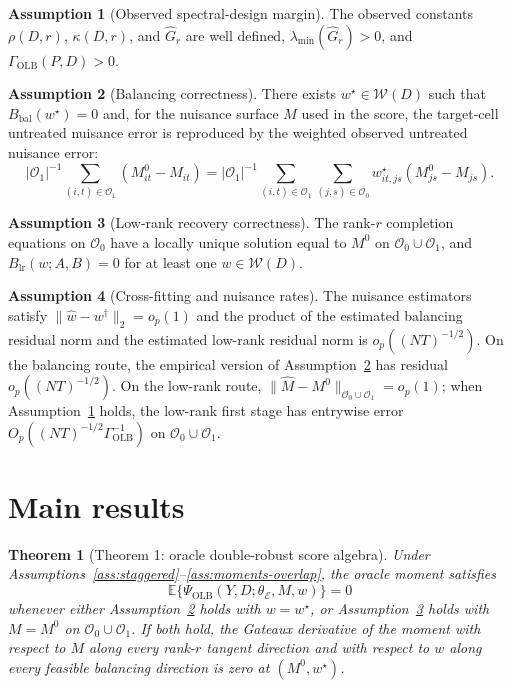 \documentclass[11pt]{article}
\newcommand{\E}{\mathbb{E}}
\theoremstyle{definition}
\newtheorem{assumption}{Assumption}
\theoremstyle{plain}
\newtheorem{theorem}{Theorem}
\theoremstyle{remark}
\begin{document}
\begin{assumption}[Observed spectral-design margin]\label{ass:spectral-margin}
The observed constants \(\rho(D,r)\), \(\kappa(D,r)\), and \(\widehat G_r\) are well defined, \(\lambda_{\min}(\widehat G_r)>0\), and \(\Gamma_{\mathrm{OLB}}(P,D)>0\).
\end{assumption}

\begin{assumption}[Balancing correctness]\label{ass:balance}
There exists \(w^\star\in\mathcal{W}(D)\) such that \(B_{\mathrm{bal}}(w^\star)=0\) and, for the nuisance surface \(M\) used in the score, the target-cell untreated nuisance error is reproduced by the weighted observed untreated nuisance error:
\[
|\mathcal{O}_1|^{-1}\sum_{(i,t)\in\mathcal{O}_1}(M^0_{it}-M_{it})
=
|\mathcal{O}_1|^{-1}\sum_{(i,t)\in\mathcal{O}_1}\sum_{(j,s)\in\mathcal{O}_0}w^\star_{it,js}(M^0_{js}-M_{js}).
\]
\end{assumption}

\begin{assumption}[Low-rank recovery correctness]\label{ass:lr-recovery}
The rank-\(r\) completion equations on \(\mathcal{O}_0\) have a locally unique solution equal to \(M^0\) on \(\mathcal{O}_0\cup\mathcal{O}_1\), and \(B_{\mathrm{lr}}(w;A,B)=0\) for at least one \(w\in\mathcal{W}(D)\).
\end{assumption}

\begin{assumption}[Cross-fitting and nuisance rates]\label{ass:rates}
The nuisance estimators satisfy \(\|\widehat w-w^\dagger\|_2=o_p(1)\) and the product of the estimated balancing residual norm and the estimated low-rank residual norm is \(o_p((NT)^{-1/2})\).  On the balancing route, the empirical version of Assumption~\ref{ass:balance} has residual \(o_p((NT)^{-1/2})\).  On the low-rank route, \(\|\widehat M-M^0\|_{\mathcal{O}_0\cup\mathcal{O}_1}=o_p(1)\); when Assumption~\ref{ass:spectral-margin} holds, the low-rank first stage has entrywise error \(O_p((NT)^{-1/2}\Gamma_{\mathrm{OLB}}^{-1})\) on \(\mathcal{O}_0\cup\mathcal{O}_1\).
\end{assumption}

\section{Main results}
\begin{theorem}[Theorem 1: oracle double-robust score algebra]\label{thm:oracle-dr}
Under Assumptions~\ref{ass:staggered}--\ref{ass:moments-overlap}, the oracle moment satisfies
\[
\E\{\Psi_{\mathrm{OLB}}(Y,D;\theta_{\mathcal{E}},M,w)\}=0
\]
whenever either Assumption~\ref{ass:balance} holds with \(w=w^\star\), or Assumption~\ref{ass:lr-recovery} holds with \(M=M^0\) on \(\mathcal{O}_0\cup\mathcal{O}_1\).  If both hold, the Gateaux derivative of the moment with respect to \(M\) along every rank-\(r\) tangent direction and with respect to \(w\) along every feasible balancing direction is zero at \((M^0,w^\star)\).
\end{theorem}
\end{document}
